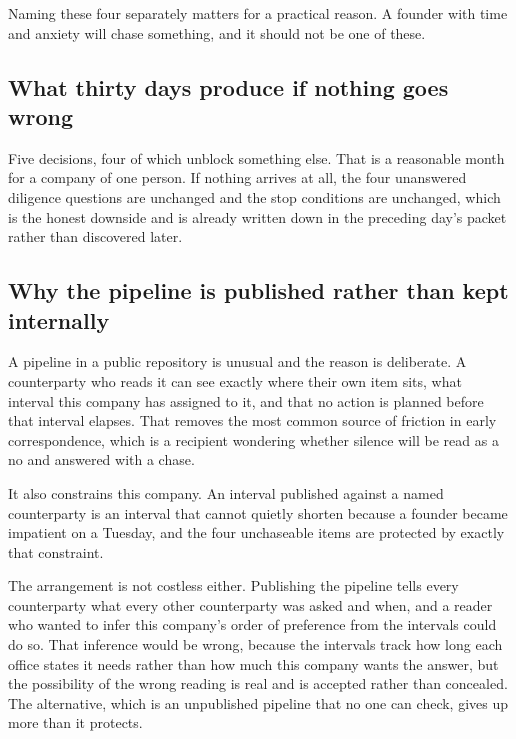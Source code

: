 Naming these four separately matters for a practical reason. A founder with time
and anxiety will chase something, and it should not be one of these.

\subsection{What thirty days produce if nothing goes wrong}

Five decisions, four of which unblock something else. That is a reasonable month
for a company of one person. If nothing arrives at all, the four unanswered
diligence questions are unchanged and the stop conditions are unchanged, which is
the honest downside and is already written down in the preceding day's packet
rather than discovered later.

\subsection{Why the pipeline is published rather than kept internally}

A pipeline in a public repository is unusual and the reason is deliberate. A
counterparty who reads it can see exactly where their own item sits, what
interval this company has assigned to it, and that no action is planned before
that interval elapses. That removes the most common source of friction in early
correspondence, which is a recipient wondering whether silence will be read as a
no and answered with a chase.

It also constrains this company. An interval published against a named
counterparty is an interval that cannot quietly shorten because a founder became
impatient on a Tuesday, and the four unchaseable items are protected by exactly
that constraint.

The arrangement is not costless either. Publishing the pipeline tells every
counterparty what every other counterparty was asked and when, and a reader who
wanted to infer this company's order of preference from the intervals could do
so. That inference would be wrong, because the intervals track how long each
office states it needs rather than how much this company wants the answer, but
the possibility of the wrong reading is real and is accepted rather than
concealed. The alternative, which is an unpublished pipeline that no one can
check, gives up more than it protects.

